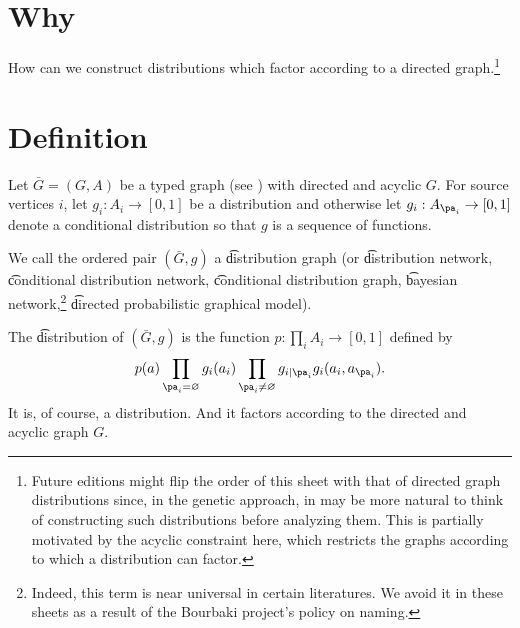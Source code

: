 

\section*{Why}

How can we construct distributions which factor according to a directed graph.\footnote{Future editions might flip the order of this sheet with that of directed graph distributions since, in the genetic approach, in may be more natural to think of constructing such distributions before analyzing them. This is partially motivated by the acyclic constraint here, which restricts the graphs according to which a distribution can factor.}

\section*{Definition}

Let $\bar{G} = (G, A)$ be a typed graph (see ) with directed and acyclic $G$.
For source vertices $i$, let $g_i: A_i \to [0, 1]$ be a distribution and otherwise let $g_{i}: A_{\pa_i} \to [0, 1]$ denote a conditional distribution so that $g$ is a sequence of functions.

We call the ordered pair $(\bar{G}, g)$ a \t{distribution graph} (or \t{distribution network}, \t{conditional distribution network}, \t{conditional distribution graph}, \t{bayesian network},\footnote{Indeed, this term is near universal in certain literatures. We avoid it in these sheets as a result of the Bourbaki project's policy on naming.}
\t{directed probabilistic graphical model}).

The \t{distribution} of $(\bar{G}, g)$ is the function $p: \prod_{i} A_i \to [0, 1]$ defined by
    \[
p(a) \prod_{\pa_i = \varnothing} g_i(a_i) \prod_{\pa_i \neq \varnothing} g_{i \mid \pa_i} g_i(a_i, a_{\pa_i}).
    \]
It is, of course, a distribution.
And it factors according to the directed and acyclic graph $G$.

\blankpage